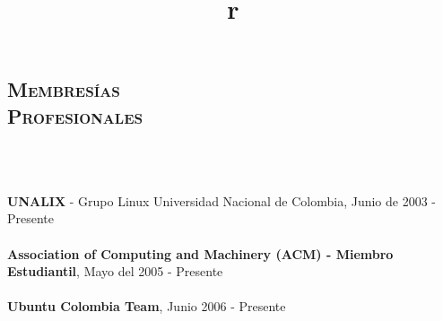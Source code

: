 \begin{resume}
\section{\textsc{Membres\'{i}as\\ Profesionales}}

\begin{formatb}
  \\
  \body\\
\end{formatb}
\employer{}
   {\textbf{UNALIX} - Grupo Linux Universidad Nacional de Colombia,
     Junio de 2003 - Presente \\ \\
    \textbf{Association of Computing and Machinery (ACM) - Miembro Estudiantil}, Mayo del  2005 - Presente \\ \\
    \textbf{Ubuntu Colombia Team}, Junio 2006 - Presente 
     }



\begin{formatb}
  \title{r}\\
  \\
 \body\\
\end{formatb}





\end{resume}

